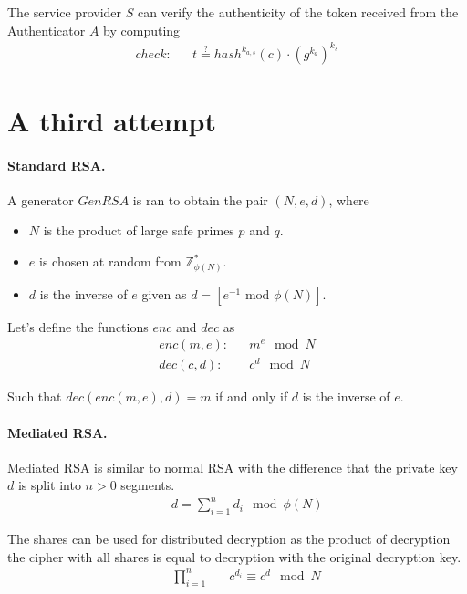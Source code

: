 The service provider $S$ can verify the authenticity of the token received from the Authenticator $A$ by computing
\begin{align*}
check: && t \stackrel{?}{=} hash^{k_{a,s}}(c) \cdot \left(g^{k_a} \right)^{k_s}
\end{align*}

\newpage
\section{A third attempt}


\paragraph{Standard RSA.}

A generator $GenRSA$ is ran to obtain the pair $(N,e,d)$, where 

\begin{itemize}
    \item $N$ is the product of large safe primes $p$ and $q$.
    \
    \item $e$ is chosen at random from $\mathbb{Z}_{\phi(N)}^*$.
    \item $d$ is the inverse of $e$ given as $d = [e^{-1} \text{ mod } \phi(N)]$.
\end{itemize}

Let's define the functions $enc$ and $dec$ as
\begin{align*}
enc(m,e): && m^e \mod N\\
dec(c,d): && c^d \mod N
\end{align*}

Such that $dec\left(enc(m,e),d\right) = m$ if and only if $d$ is the inverse of $e$.

\paragraph{Mediated RSA.} Mediated RSA is similar to normal RSA with the difference that the private key $d$ is split into $n > 0$ segments.
\begin{align*}
&& d = \sum\limits_{i=1}^n d_i \mod \phi(N)
\end{align*}

The shares can be used for distributed decryption as the product of decryption the cipher with all shares is equal to decryption with the original decryption key.
\begin{align*}
&& \prod\limits_{i=1}^n& \quad c^{d_i} \equiv c^d \mod N
\end{align*}

